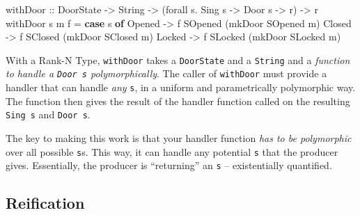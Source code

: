 \documentclass[]{article}
\newenvironment{Shaded}{}{}
\newcommand{\DataTypeTok}[1]{\textcolor[rgb]{0.56,0.13,0.00}{#1}}
\newcommand{\FunctionTok}[1]{\textcolor[rgb]{0.02,0.16,0.49}{#1}}
\newcommand{\KeywordTok}[1]{\textcolor[rgb]{0.00,0.44,0.13}{\textbf{#1}}}
\newcommand{\NormalTok}[1]{#1}
\newcommand{\OtherTok}[1]{\textcolor[rgb]{0.00,0.44,0.13}{#1}}
\newcommand{\StringTok}[1]{\textcolor[rgb]{0.25,0.44,0.63}{#1}}
\begin{document}
\begin{Shaded}
\begin{Highlighting}[]
\NormalTok{withDoor}
\OtherTok{    ::} \DataTypeTok{DoorState}
    \OtherTok{->} \DataTypeTok{String}
    \OtherTok{->}\NormalTok{ (forall s}\FunctionTok{.} \DataTypeTok{Sing}\NormalTok{ s }\OtherTok{->} \DataTypeTok{Door}\NormalTok{ s }\OtherTok{->}\NormalTok{ r) }\OtherTok{->}\NormalTok{ r}
\NormalTok{withDoor s m f }\FunctionTok{=} \KeywordTok{case}\NormalTok{ s }\KeywordTok{of}
    \DataTypeTok{Opened} \OtherTok{->}\NormalTok{ f }\DataTypeTok{SOpened}\NormalTok{ (mkDoor }\DataTypeTok{SOpened}\NormalTok{ m)}
    \DataTypeTok{Closed} \OtherTok{->}\NormalTok{ f }\DataTypeTok{SClosed}\NormalTok{ (mkDoor }\DataTypeTok{SClosed}\NormalTok{ m)}
    \DataTypeTok{Locked} \OtherTok{->}\NormalTok{ f }\DataTypeTok{SLocked}\NormalTok{ (mkDoor }\DataTypeTok{SLocked}\NormalTok{ m)}
\end{Highlighting}
\end{Shaded}

With a Rank-N Type, \texttt{withDoor} takes a \texttt{DoorState} and a
\texttt{String} and a \emph{function to handle a \texttt{Door\ s}
polymorphically}. The caller of \texttt{withDoor} must provide a handler that
can handle \emph{any} \texttt{s}, in a uniform and parametrically polymorphic
way. The function then gives the result of the handler function called on the
resulting \texttt{Sing\ s} and \texttt{Door\ s}.

\begin{Shaded}
\end{Shaded}

The key to making this work is that your handler function \emph{has to be
polymorphic} over all possible \texttt{s}s. This way, it can handle any
potential \texttt{s} that the producer gives. Essentially, the producer is
``returning'' an \texttt{s} -- existentially quantified.

\hypertarget{reification}{%
\subsection{Reification}\label{reification}}
\end{document}
